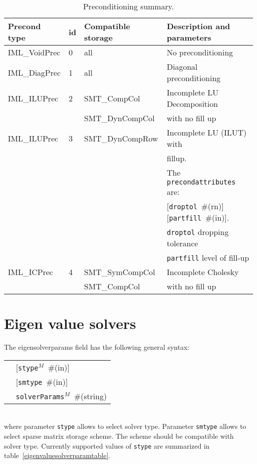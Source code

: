 \documentclass[a4paper]{report}
\newcommand{\param}[1]{\texttt{#1}} %
\newcommand{\optional}[1]{[#1]} %
\newcommand{\field}[2]{\param{#1}~\#{\tiny(#2)}} %
\newcommand{\optField}[2]{\optional{\field{#1}{#2}}}
\newenvironment{record}[1][]{\begin{tabular}{|ll}}{\end{tabular}\\}
\newcommand{\recentry}[2]{{#1}&{#2}\\}
\newcounter{rcc}
\newenvironment{record}[1][\textwidth]{\setcounter{rcc}{0}\rowcolors{1}{lightgray}{lightgray}\tabularx{#1}{llR} \hline}
               {\endtabularx}
\newcommand{\recentry}[2]{\ifthenelse{\value{rcc}>0}{$\backslash$ \\}{\setcounter{rcc}{1}}{#1}&{#2}&}
\begin{document}
\begin{table}[ht]
\begin{center}
\begin{tabular}{|l|l|l|l|}
\hline
Precond type & id & Compatible storage & Description and parameters \\
\hline\hline
IML\_VoidPrec &0& all & No preconditioning\\
\hline
IML\_DiagPrec &1& all & Diagonal preconditioning\\
\hline
IML\_ILUPrec  &2& SMT\_CompCol & Incomplete LU Decomposition\\
              & & SMT\_DynCompCol&with no fill up\\
\hline
IML\_ILUPrec  &3& SMT\_DynCompRow & Incomplete LU (ILUT) with\\
              & &                 &  fillup. \\
              & &                 & The \param{precondattributes} are:\\
              & &                 & \optField{droptol}{rn} \optField{partfill}{in}.\\
              & &                 & \param{droptol} dropping tolerance\\
              & &                 & \param{partfill} level of fill-up\\
\hline
IML\_ICPrec   &4& SMT\_SymCompCol&Incomplete Cholesky\\
              & & SMT\_CompCol   &with no fill up\\
\hline
\end{tabular}
\caption{Preconditioning summary.}
\label{precondtable}
\end{center}
\end{table}

\section{Eigen value solvers}
\label{eigensolverssection}
The eigensolverparams field has the following general syntax:\\
\begin{record}
  \recentry{\hspace{20mm}}{\optField{stype$^M$}{in}}
  \recentry{}{\optField{smtype}{in}}
  \recentry{}{\field{solverParams$^M$}{string}}
\end{record}
where parameter \param{stype} allows to select solver type. Parameter \param{smtype} allows to select sparse matrix storage
scheme. The scheme should be compatible with solver type. Currently supported values of \param{stype} are summarized in table~\ref{eigenvaluesolverparamtable}.
\end{document}
